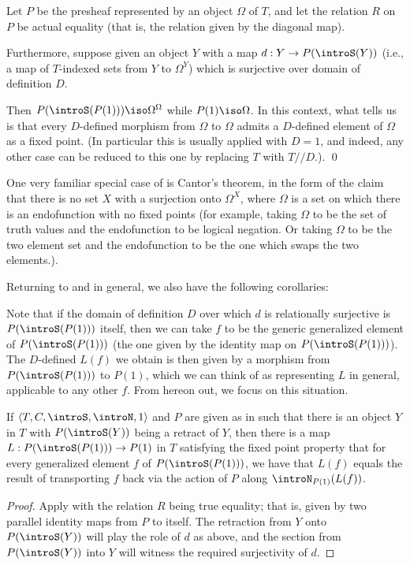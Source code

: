 Let $P$ be the presheaf represented by an object $\Omega$ of $T$, and let the relation $R$ on $P$ be actual equality (that is, the relation given by the diagonal map). 

Furthermore, suppose given an object $Y$ with a map $d : Y \to P(\introS(Y))$ (i.e., a map of $T$-indexed sets from $Y$ to $\Omega^Y$) which is surjective over domain of definition $D$.

Then $P(\introS(P(1))) \iso \Omega^{\Omega}$ while $P(1) \iso \Omega$. In this context, what  tells us is that every $D$-defined morphism from $\Omega$ to $\Omega$ admits a $D$-defined element of $\Omega$ as a fixed point. (In particular this is usually applied with $D = 1$, and indeed, any other case can be reduced to this one by replacing $T$ with $T//D$.). \qed
{}

\label{CantorsTheorem}
One very familiar special case of  is Cantor's theorem, in the form of the claim that there is no set $X$ with a surjection onto $\Omega^X$, where $\Omega$ is a set on which there is an endofunction with no fixed points (for example, taking $\Omega$ to be the set of truth values and the endofunction to be logical negation. Or taking $\Omega$ to be the two element set and the endofunction to be the one which swaps the two elements.).

Returning to  and  in general, we also have the following corollaries:

\begin{corollary}\label{RetractDiag}
Note that if the domain of definition $D$ over which $d$ is relationally surjective is $P(\introS(P(1)))$ itself, then we can take $f$ to be the generic generalized element of $P(\introS(P(1)))$ (the one given by the identity map on $P(\introS(P(1)))$). The $D$-defined $L(f)$ we obtain is then given by a morphism from $P(\introS(P(1)))$ to $P(1)$, which we can think of as representing $L$ in general, applicable to any other $f$. From hereon out, we focus on this situation.
\end{corollary}

\begin{corollary}\label{RetractInT}
If $\langle T, C, \introS, \introN, 1 \rangle$ and $P$ are given as in  such that there is an object $Y$ in $T$ with $P(\introS(Y))$ being a retract of $Y$, then there is a map $L : P(\introS(P(1))) \to P(1)$ in $T$ satisfying the fixed point property that for every generalized element $f$ of $P(\introS(P(1)))$, we have that $L(f)$ equals the result of transporting $f$ back via the action of $P$ along $\introN_{P(1)}(L(f))$.
\end{corollary}
\begin{proof}
Apply  with the relation $R$ being true equality; that is, given by two parallel identity maps from $P$ to itself. The retraction from $Y$ onto $P(\introS(Y))$ will play the role of $d$ as above, and the section from $P(\introS(Y))$ into $Y$ will witness the required surjectivity of $d$.
\end{proof}


